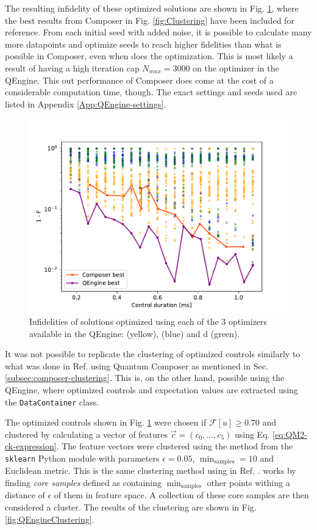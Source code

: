 \documentclass[a4paper, twocolumn]{revtex4-1}
\begin{document}
The resulting infidelity of these optimized solutions are shown in Fig. \ref{fig:QEngine_noise}, where the best results from Composer in Fig. \ref{fig:Clustering} have been included for reference. From each initial seed with added noise, it is possible to calculate many more datapoints and optimize seeds to reach higher fidelities than what is possible in Composer, even when  does the optimization. This is most likely a result of having a high iteration cap $N_{max}=3000$ on the optimizer in the QEngine. This out performance of Composer does come at the cost of a considerable computation time, though. The exact settings and seeds used are listed in Appendix \ref{App:QEngine-settings}.

\begin{figure}
	\includegraphics[width=1.1\columnwidth]{graphics/qengine/noiseDemoInf.pdf}
	\caption{Infidelities of solutions optimized using each of the 3 optimizers available in the QEngine:  (yellow),  (blue) and d (green). }
	\label{fig:QEngine_noise}
\end{figure}

It was not possible to replicate the clustering of optimized controls similarly to what was done in Ref. \cite{QM2Paper} using Quantum Composer as mentioned in Sec. \ref{subsec:composer-clustering}. This is, on the other hand, possible using the QEngine, where optimized controls and expectation values are extracted using the \texttt{DataContainer} class.

The optimized controls shown in Fig. \ref{fig:QEngine_noise} were chosen if $\mathcal{F}[u] \geq 0.70$ and clustered by calculating a vector of features $\vec{c} = (c_0, \dots, c_5)$ using Eq. \eqref{eq:QM2-ck-expression}. The feature vectors were clustered using the  method from the \texttt{sklearn} Python module with parameters $\epsilon = 0.05 $, 
$\min_{\text{samples}} = 10$ and Euclidean metric. This is the same clustering method using in Ref. \cite{QM2Paper}.  works by finding \textit{core samples} defined as containing $\min_{\text{samples}}$ other points withing a distance of $\epsilon$ of them in feature space. A collection of these core samples are then considered a cluster. The results of the clustering are shown in Fig. \ref{fig:QEngineClustering}.
\end{document}
